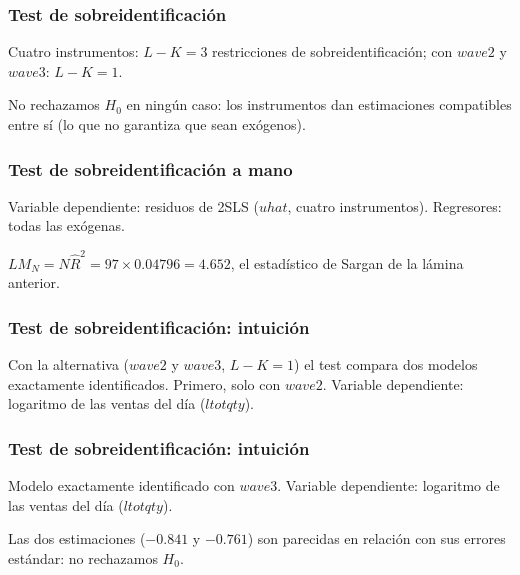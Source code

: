 \documentclass[t, compress, spanish, aspectratio=169]{beamer}
\begin{document}
\begin{frame}
	\frametitle{Test de sobreidentificaci\'on}
	Cuatro instrumentos: $L-K=3$ restricciones de sobreidentificaci\'on; con $wave2$ y $wave3$: $L-K=1$.
	\begin{center}
	\small
	
	\end{center}
	\small
	No rechazamos $H_0$ en ning\'un caso: los instrumentos dan estimaciones compatibles entre s\'i (lo que no garantiza que sean ex\'ogenos).
\end{frame}
\begin{frame}
	\frametitle{Test de sobreidentificaci\'on a mano}
	\vspace*{-0.6em}
	Variable dependiente: residuos de 2SLS ($uhat$, cuatro instrumentos). Regresores: todas las ex\'ogenas.
	\begin{center}
	\scriptsize\renewcommand{\arraystretch}{0.9}
	
	\end{center}
	\small
	$LM_N=N \hat R^2 = 97 \times 0.04796=4.652$, el estad\'istico de Sargan de la l\'amina anterior.
\end{frame}
\begin{frame}
	\frametitle{Test de sobreidentificaci\'on: intuici\'on}
	Con la alternativa ($wave2$ y $wave3$, $L-K=1$) el test compara dos modelos exactamente identificados. Primero, solo con $wave2$. Variable dependiente: logaritmo de las ventas del d\'ia ($ltotqty$).
	\begin{center}
	\footnotesize\renewcommand{\arraystretch}{0.9}
	
	\end{center}
\end{frame}
\begin{frame}
	\frametitle{Test de sobreidentificaci\'on: intuici\'on}
	Modelo exactamente identificado con $wave3$. Variable dependiente: logaritmo de las ventas del d\'ia ($ltotqty$).
	\begin{center}
	\footnotesize\renewcommand{\arraystretch}{0.9}
	
	\end{center}
	\small
	Las dos estimaciones ($-0.841$ y $-0.761$) son parecidas en relaci\'on con sus errores est\'andar: no rechazamos $H_0$.
\end{frame}
\end{document}
